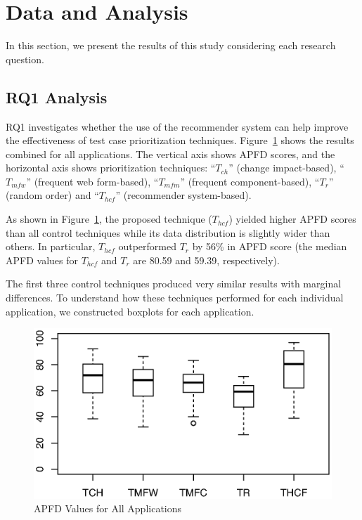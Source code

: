 \section{Data and Analysis}
\label{sec:data}

In this section, we present the results of this study considering
each research question. 

\subsection{RQ1 Analysis}

RQ1 investigates whether the use of the recommender system can help
improve the effectiveness of test case prioritization techniques.
Figure~\ref{fig:All} shows the results combined for all applications.
The vertical axis shows APFD scores, and the horizontal axis shows 
prioritization techniques:
``$T_{ch}$'' (change impact-based), ``$T_{mfw}$'' (frequent web form-based), 
``$T_{mfm}$'' (frequent component-based), ``$T_{r}$'' (random order) and 
``$T_{hcf}$'' (recommender system-based). 

As shown in Figure~\ref{fig:All}, the proposed technique ($T_{hcf}$) 
yielded higher APFD scores than all control techniques while its data 
distribution is slightly wider than others. 
In particular, $T_{hcf}$ outperformed $T_{r}$ by 56\% in APFD 
score (the median APFD values for $T_{hcf}$ and $T_{r}$ are 80.59 and
59.39, respectively). 

The first three control techniques produced very similar results 
with marginal differences.
To understand how these techniques performed for each individual
application, we constructed boxplots for each application.
 
\begin{figure}[!ht]
	\centering
	\includegraphics[width=1.05\linewidth]{./Total_adjusted.eps}
	\vspace*{-10pt}
	\caption{APFD Values for All Applications}
	\label{fig:All}
\end{figure} 

